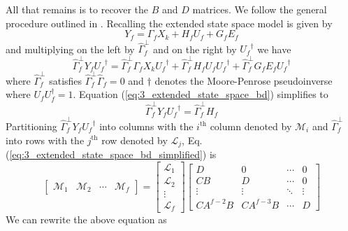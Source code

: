 All that remains is to recover the $B$ and $D$ matrices. We follow the general procedure outlined in \cite{trnka2007subspace}. Recalling the extended state space model is given by
\begin{equation*}
Y_f = \Gamma_f X_k + H_f U_f + G_f E_f
\end{equation*}
and multiplying on the left by $\hat{\Gamma}_f^\perp$ and on the right by ${U_f}^\dagger$ we have
\begin{equation}\label{eq:3_extended_state_space_bd}
\hat{\Gamma}_f^\perp Y_f {U_f}^\dagger = \hat{\Gamma}_f^\perp\Gamma_f X_k {U_f}^\dagger + \hat{\Gamma}_f^\perp H_f U_f {U_f}^\dagger + \hat{\Gamma}_f^\perp G_f E_f {U_f}^\dagger
\end{equation}
where $\hat{\Gamma}_f^\perp$ satisfies $\hat{\Gamma}_f^\perp\hat{\Gamma}_f = 0$ and $\dagger$ denotes the Moore-Penrose pseudoinverse where $U_f U_f^\dagger = 1$. Equation (\ref{eq:3_extended_state_space_bd}) simplifies to
\begin{equation}\label{eq:3_extended_state_space_bd_simplified}
\hat{\Gamma}_f^\perp Y_f {U_f}^\dagger = \hat{\Gamma}_f^\perp H_f 
\end{equation}
Partitioning $\hat{\Gamma}_f^\perp Y_f {U_f}^\dagger$ into columns with the $i^{\mbox{th}}$ column denoted by $\mathcal{M}_i$ and $\hat{\Gamma}_f^\perp$ into rows with the $j^{\mbox{th}}$ row denoted by $\mathcal{L}_j$, Eq. (\ref{eq:3_extended_state_space_bd_simplified}) is
\begin{equation*}
\begin{bmatrix}\mathcal{M}_1 & \mathcal{M}_2 & \cdots & \mathcal{M}_f\end{bmatrix} = 
\begin{bmatrix}\mathcal{L}_1\\ \mathcal{L}_2\\ \vdots\\ \mathcal{L}_f\end{bmatrix}
\begin{bmatrix}
D & 0 & \cdots & 0\\
CB & D & \cdots & 0\\
\vdots & \vdots  & \ddots & \vdots\\
CA^{f-2}B & CA^{f-3}B & \cdots & D
\end{bmatrix}
\end{equation*}
We can rewrite the above equation as
